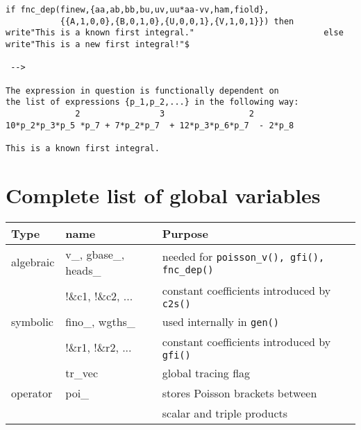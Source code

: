 \documentclass[12pt]{article}
\begin{document}
\begin{description}
\begin{verbatim}
if fnc_dep(finew,{aa,ab,bb,bu,uv,uu*aa-vv,ham,fiold}, 
           {{A,1,0,0},{B,0,1,0},{U,0,0,1},{V,1,0,1}}) then 
write"This is a known first integral."                          else 
write"This is a new first integral!"$

 --> 

The expression in question is functionally dependent on
the list of expressions {p_1,p_2,...} in the following way:
              2                3                 2
10*p_2*p_3*p_5 *p_7 + 7*p_2*p_7  + 12*p_3*p_6*p_7  - 2*p_8

This is a known first integral. \end{verbatim}
\end{description}

\section{Complete list of global variables}

\begin{center}
\begin{tabular}{l|l|l} 
 Type      &  name    & Purpose \\ \hline
 algebraic &  v\_, gbase\_, heads\_ & needed for {\tt poisson\_v(), 
                                      gfi(), fnc\_dep()} \\
           &  !\&c1, !\&c2, ...     & constant coefficients introduced 
                                      by {\tt c2s()}   \\ \hline
 symbolic  &  fino\_, wgths\_       & used internally in {\tt gen()} \\
           &  !\&r1, !\&r2, ...     & constant coefficients introduced 
                                      by {\tt gfi()}   \\
           &  tr\_vec               & global tracing flag \\ \hline
 operator  &  poi\_                 & stores Poisson brackets between \\
           &                        & scalar and triple products
\end{tabular} 
\end{center}
\end{document}
